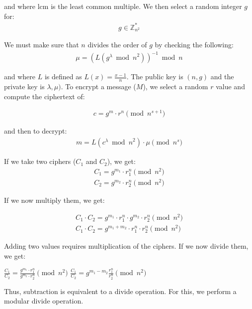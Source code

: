 \documentclass[envcountsame,runningheads,notitlepage]{llncs}
\begin{document}
and where lcm is the least common multiple. We then select a random integer $g$ for:
\begin{align}
\displaystyle g \in \mathbb {Z} _{n^{2}}^{*}
\end{align}

We must make sure that $n$ divides the order of $g$ by checking the following: 
\begin{align}
\mu =(L(g^{\lambda }{\bmod {n}}^{2}))^{-1}{\bmod {n}}
\end{align}

and where $L$ is defined as $L(x)=\frac {x-1}{n}$. The public key is $(n,g)$ and the private key is $\lambda,\mu )$. To encrypt a message ($M$), we select a random $r$ value and compute the ciphertext of:

\begin{align}
c=g^{m}\cdot r^{n} \pmod {n^{s+1}}
\end{align}

and then to decrypt:
\begin{align}
m=L(c^{\lambda }{\bmod n}^{2})\cdot \mu {\pmod n^s} 
\end{align}

If we take two ciphers ($C_1$ and $C_2$), we get:
\begin{align}
C_1 = g^{m_1}\cdot r_1^{n} \pmod {n^{2}} \\
C_2 = g^{m_2}\cdot r_2^{n} \pmod {n^{2}} 
\end{align}

If we now multiply them, we get:

\begin{align}
C_1 \cdot C_2 = g^{m_1}\cdot r_1^{n} \cdot g^{m_2}\cdot r_2^{n} \pmod {n^{2}}\\
C_1 \cdot C_2 = g^{m_1+m_2}\cdot r_1^{n} \cdot r_2^{n} \pmod {n^{2}}
\end{align}

Adding two values requires multiplication of the ciphers. If we now divide them, we get:

$\frac{C_1}  {C_2} = \frac{ g^{m_1}\cdot r_1^{n}}{g^{m_2}\cdot r_2^{n}} \pmod {n^{2}}   $
$\frac{C_1}  {C_2} =  g^{m_1-m_2} \frac{r_1^{n}}{r_2^{n}} \pmod {n^{2}}  $

Thus, subtraction is equivalent to a divide operation. For this, we perform a modular divide operation.
\end{document}
